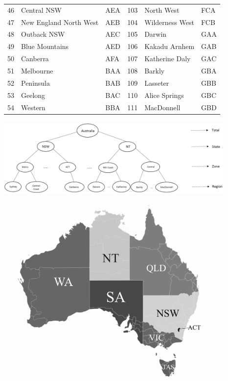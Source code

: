 \documentclass[11pt,a4paper,]{article}
\let\origfigure\figure
\let\endorigfigure\endfigure
\renewenvironment{figure}[1][2] {
    \expandafter\origfigure\expandafter[!htbp]
} {
    \endorigfigure
}
\begin{document}
\begin{longtable}[t]{rllrll}
46 & Central NSW & AEA & 103 & North West & FCA\\
47 & New England North West & AEB & 104 & Wilderness West & FCB\\
48 & Outback NSW & AEC & 105 & Darwin & GAA\\
49 & Blue Mountains & AED & 106 & Kakadu Arnhem & GAB\\
50 & Canberra & AFA & 107 & Katherine Daly & GAC\\
51 & Melbourne & BAA & 108 & Barkly & GBA\\
52 & Peninsula & BAB & 109 & Lasseter & GBB\\
53 & Geelong & BAC & 110 & Alice Springs & GBC\\
54 & Western & BBA & 111 & MacDonnell & GBD\\
\bottomrule
\end{longtable}
\endgroup{}

\begin{figure}

{\centering \includegraphics[width=450px,height=150px]{Paper-Figures/Australian_hierarchy_structure} 

}

\caption{Australian geographic hierarchical structure.}\label{fig:Australiahierarchystructure}
\end{figure}

\begin{figure}

{\centering \includegraphics[width=450px,height=360px]{Paper-Figures/ausTurRegionsBW} 

}

\caption{Australia map, showing the eight states.}\label{fig:Australiahierarchystructuremap}
\end{figure}
\end{document}
